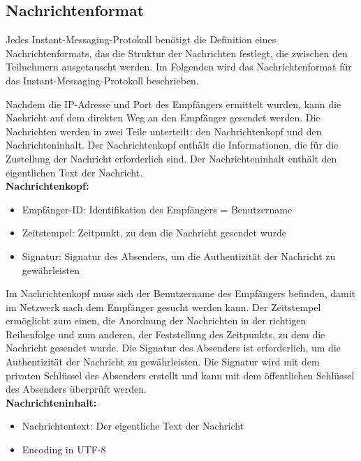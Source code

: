 \subsection{Nachrichtenformat}

Jedes Instant-Messaging-Protokoll benötigt die Definition eines Nachrichtenformats, das die Struktur der Nachrichten festlegt, die zwischen den Teilnehmern ausgetauscht werden. Im Folgenden wird das Nachrichtenformat für das Instant-Messaging-Protokoll beschrieben. 

Nachdem die IP-Adresse und Port des Empfängers ermittelt wurden, kann die Nachricht auf dem direkten Weg an den Empfänger gesendet werden. Die Nachrichten werden in zwei Teile unterteilt: den Nachrichtenkopf und den Nachrichteninhalt. Der Nachrichtenkopf enthält die Informationen, die für die Zustellung der Nachricht erforderlich sind. Der Nachrichteninhalt enthält den eigentlichen Text der Nachricht. 
\\

\noindent \textbf{Nachrichtenkopf:}
\begin{itemize}
    \item Empfänger-ID: Identifikation des Empfängers = Benutzername
    \item Zeitstempel: Zeitpunkt, zu dem die Nachricht gesendet wurde
    \item Signatur: Signatur des Absenders, um die Authentizität der Nachricht zu gewährleisten
\end{itemize}

\noindent Im Nachrichtenkopf muss sich der Benutzername des Empfängers befinden, damit im Netzwerk nach dem Empfänger gesucht werden kann. Der Zeitstempel ermöglicht zum einen, die Anordnung der Nachrichten in der richtigen Reihenfolge und zum anderen, der Feststellung des Zeitpunkts, zu dem die Nachricht gesendet wurde. Die Signatur des Absenders ist erforderlich, um die Authentizität der Nachricht zu gewährleisten. Die Signatur wird mit dem privaten Schlüssel des Absenders erstellt und kann mit dem öffentlichen Schlüssel des Absenders überprüft werden.
\\


\noindent \textbf{Nachrichteninhalt:}
\begin{itemize}
    \item Nachrichtentext: Der eigentliche Text der Nachricht
    \item Encoding in UTF-8
\end{itemize}

